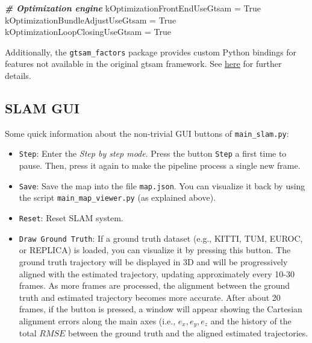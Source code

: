 \documentclass{article}
\newenvironment{Shaded}{\begin{snugshade}}{\end{snugshade}}
\newcommand{\CommentTok}[1]{\textcolor[rgb]{0.00,0.40,1.00}{\textbf{\textit{#1}}}}
\newcommand{\NormalTok}[1]{\textcolor[rgb]{0.74,0.68,0.62}{#1}}
\newcommand{\OperatorTok}[1]{\textcolor[rgb]{0.74,0.68,0.62}{#1}}
\newcommand{\VariableTok}[1]{\textcolor[rgb]{0.74,0.68,0.62}{#1}}
\begin{document}
\begin{scriptsize}
  \begin{Shaded}
    \begin{Highlighting}[]
      \CommentTok{# Optimization engine }
    \NormalTok{  kOptimizationFrontEndUseGtsam }\OperatorTok{=} \VariableTok{True}    
    \NormalTok{  kOptimizationBundleAdjustUseGtsam }\OperatorTok{=} \VariableTok{True} 
    \NormalTok{  kOptimizationLoopClosingUseGtsam }\OperatorTok{=} \VariableTok{True} 
    \end{Highlighting}
    \end{Shaded}
\end{scriptsize}

Additionally, the \texttt{gtsam\_factors} package provides custom Python
bindings for features not available in the original gtsam framework. See
\href{https://github.com/luigifreda/pyslam/blob/master/thirdparty/gtsam_factors/README.md}{here} for further details.

\hypertarget{slam-gui}{%
\subsection{SLAM GUI}\label{slam-gui}}

Some quick information about the non-trivial GUI buttons of \texttt{main\_slam.py}:

\begin{itemize}
    \item \texttt{Step}: Enter the \emph{Step by step mode}. Press the button \texttt{Step} a first time to pause. Then, press it again to make the pipeline process a single new frame.

    \item \texttt{Save}: Save the map into the file \texttt{map.json}. You can visualize it back by using the script \texttt{main\_map\_viewer.py} (as explained above).

    \item \texttt{Reset}: Reset SLAM system.

    \item \texttt{Draw Ground Truth}: If a ground truth dataset (e.g., KITTI,
    TUM, EUROC, or REPLICA) is loaded, you can visualize it by pressing this
    button. The ground truth trajectory will be displayed in 3D and will be
    progressively aligned with the estimated trajectory, updating
    approximately every 10-30 frames. As more frames are processed, the
    alignment between the ground truth and estimated trajectory becomes more
    accurate. After about 20 frames, if the button is pressed, a window will
    appear showing the Cartesian alignment errors along the main axes (i.e.,
    $e_x, e_y, e_z$ and the history of the total $RMSE$ between
    the ground truth and the aligned estimated trajectories.
\end{itemize}
\end{document}
